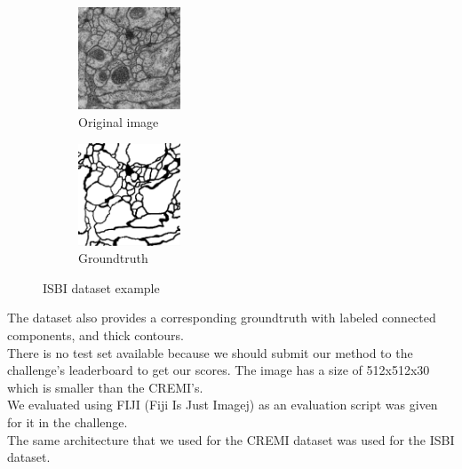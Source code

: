 \begin{figure}[!htbp]
    \centering
	\begin{subfigure}[t]{0.31\textwidth}
        \centering
        \includegraphics[height=1.2in]{./images/isbi_orig_1.png}
        \caption{Original image}
    \end{subfigure}%
    \begin{subfigure}[t]{0.31\textwidth}
        \centering
        \includegraphics[height=1.2in]{./images/isbi_gt_1.png}
        \caption{Groundtruth}
    \end{subfigure}
    \caption{ISBI dataset example}
\end{figure}

The dataset also provides a corresponding groundtruth with labeled connected components, and thick contours.\\
There is no test set available because we should submit our method to the challenge's leaderboard to get our scores.
The image has a size of 512x512x30 which is smaller than the CREMI's.\\
We evaluated using FIJI (Fiji Is Just Imagej) as an evaluation script was given
for it in the challenge.\\

The same architecture that we used for the CREMI dataset was used for the ISBI dataset.\\

